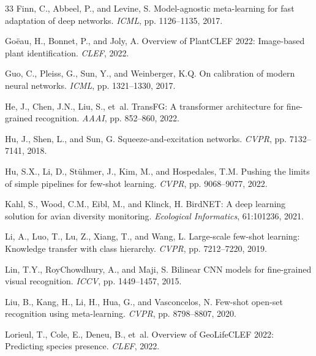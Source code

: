 \documentclass[11pt,a4paper]{article}
\begin{document}
\begin{thebibliography}{33}
Finn, C., Abbeel, P., and Levine, S.
\newblock Model-agnostic meta-learning for fast adaptation of deep networks.
\newblock \emph{ICML}, pp. 1126--1135, 2017.

Go{\"e}au, H., Bonnet, P., and Joly, A.
\newblock Overview of PlantCLEF 2022: Image-based plant identification.
\newblock \emph{CLEF}, 2022.

Guo, C., Pleiss, G., Sun, Y., and Weinberger, K.Q.
\newblock On calibration of modern neural networks.
\newblock \emph{ICML}, pp. 1321--1330, 2017.

He, J., Chen, J.N., Liu, S., et~al.
\newblock TransFG: A transformer architecture for fine-grained recognition.
\newblock \emph{AAAI}, pp. 852--860, 2022.

Hu, J., Shen, L., and Sun, G.
\newblock Squeeze-and-excitation networks.
\newblock \emph{CVPR}, pp. 7132--7141, 2018.

Hu, S.X., Li, D., St{\"u}hmer, J., Kim, M., and Hospedales, T.M.
\newblock Pushing the limits of simple pipelines for few-shot learning.
\newblock \emph{CVPR}, pp. 9068--9077, 2022.

Kahl, S., Wood, C.M., Eibl, M., and Klinck, H.
\newblock BirdNET: A deep learning solution for avian diversity monitoring.
\newblock \emph{Ecological Informatics}, 61:101236, 2021.

Li, A., Luo, T., Lu, Z., Xiang, T., and Wang, L.
\newblock Large-scale few-shot learning: Knowledge transfer with class hierarchy.
\newblock \emph{CVPR}, pp. 7212--7220, 2019.

Lin, T.Y., RoyChowdhury, A., and Maji, S.
\newblock Bilinear CNN models for fine-grained visual recognition.
\newblock \emph{ICCV}, pp. 1449--1457, 2015.

Liu, B., Kang, H., Li, H., Hua, G., and Vasconcelos, N.
\newblock Few-shot open-set recognition using meta-learning.
\newblock \emph{CVPR}, pp. 8798--8807, 2020.

Lorieul, T., Cole, E., Deneu, B., et~al.
\newblock Overview of GeoLifeCLEF 2022: Predicting species presence.
\newblock \emph{CLEF}, 2022.


\end{thebibliography}
\end{document}
